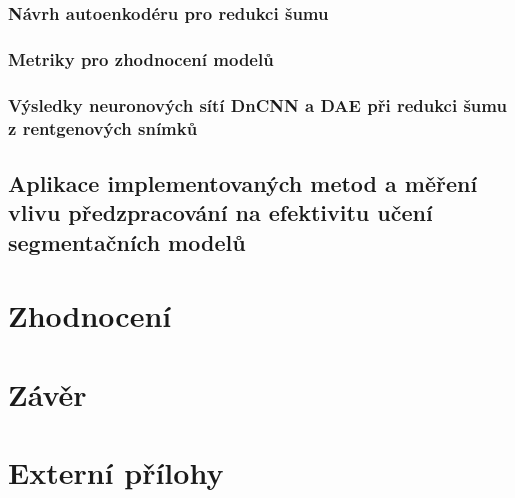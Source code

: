 \documentclass[male,czech,api_ing]{thesis}
\begin{document}
\subsection{Návrh autoenkodéru pro redukci šumu}

\subsection{Metriky pro zhodnocení modelů}

\subsection{Výsledky neuronových sítí DnCNN a DAE při redukci šumu z rentgenových snímků}


\section{Aplikace implementovaných metod a měření vlivu předzpracování na efektivitu učení segmentačních modelů}



\chapter{Zhodnocení} 

\chapter{Závěr}

\printbibliography[title=Seznam použitých zdrojů]

\listoffigures

\listoftables

\lstlistoflistings

\appendix

\chapter{Externí přílohy\label{sec:ep}}


\end{document}
